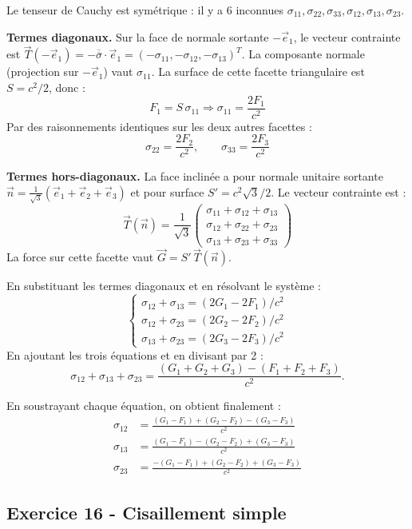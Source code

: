\documentclass[12pt,a4paper]{article}
\begin{document}
\begin{boitecorrige}
Le tenseur de Cauchy est symétrique : il y a 6 inconnues $\sigma_{11},\sigma_{22},\sigma_{33},\sigma_{12},\sigma_{13},\sigma_{23}$.

\textbf{Termes diagonaux.} Sur la face de normale sortante $-\vec{e}_1$, le vecteur contrainte est $\vec{T}(-\vec{e}_1)=-\overline{\overline{\sigma}}\cdot\vec{e}_1 = (-\sigma_{11},-\sigma_{12},-\sigma_{13})^T$. La composante normale (projection sur $-\vec{e}_1$) vaut $\sigma_{11}$. La surface de cette facette triangulaire est $S = c^2/2$, donc :
\[
F_1 = S\,\sigma_{11} \Longrightarrow \sigma_{11} = \frac{2F_1}{c^2}
\]
Par des raisonnements identiques sur les deux autres facettes :
\[
\sigma_{22} = \frac{2F_2}{c^2}, \qquad \sigma_{33} = \frac{2F_3}{c^2}
\]

\textbf{Termes hors-diagonaux.} La face inclinée a pour normale unitaire sortante $\vec{n} = \frac{1}{\sqrt{3}}(\vec{e}_1+\vec{e}_2+\vec{e}_3)$ et pour surface $S' = c^2\sqrt{3}/2$. Le vecteur contrainte est :
\[
\vec{T}(\vec{n}) = \frac{1}{\sqrt{3}}\begin{pmatrix}\sigma_{11}+\sigma_{12}+\sigma_{13}\\\sigma_{12}+\sigma_{22}+\sigma_{23}\\\sigma_{13}+\sigma_{23}+\sigma_{33}\end{pmatrix}
\]
La force sur cette facette vaut $\vec{G} = S'\,\vec{T}(\vec{n})$.

En substituant les termes diagonaux et en résolvant le système :
\[
\begin{cases}
\sigma_{12}+\sigma_{13} = (2G_1-2F_1)/c^2\\[2pt]
\sigma_{12}+\sigma_{23} = (2G_2-2F_2)/c^2\\[2pt]
\sigma_{13}+\sigma_{23} = (2G_3-2F_3)/c^2
\end{cases}
\]
En ajoutant les trois équations et en divisant par 2 :
\[
\sigma_{12}+\sigma_{13}+\sigma_{23} = \frac{(G_1+G_2+G_3)-(F_1+F_2+F_3)}{c^2}.
\]

En soustrayant chaque équation, on obtient finalement :
\begin{align*}
\sigma_{12} &= \frac{(G_1-F_1)+(G_2-F_2)-(G_3-F_3)}{c^2}\\
\sigma_{13} &= \frac{(G_1-F_1)-(G_2-F_2)+(G_3-F_3)}{c^2}\\
\sigma_{23} &= \frac{-(G_1-F_1)+(G_2-F_2)+(G_3-F_3)}{c^2}
\end{align*}
\end{boitecorrige}

\subsection*{Exercice 16 - Cisaillement simple \niveau{\facile}}
\end{document}
